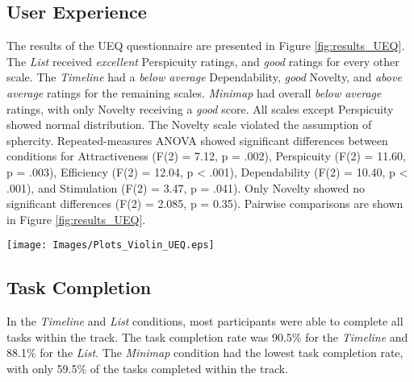 \subsection{User Experience}
The results of the UEQ questionnaire are presented in Figure \ref{fig:results_UEQ}. The \textit{List} received \textit{excellent} Perspicuity ratings, and \textit{good} ratings for every other scale. The \textit{Timeline} had a \textit{below average} Dependability, \textit{good} Novelty, and \textit{above average} ratings for the remaining scales. \textit{Minimap} had overall \textit{below average} ratings, with only Novelty receiving a \textit{good} score. All scales except Perspicuity showed normal distribution. The Novelty scale violated the assumption of sphercity. Repeated-measures ANOVA showed significant differences between conditions for Attractiveness (F(2) = 7.12, p = .002), Perspicuity (F(2) = 11.60, p = .003), Efficiency (F(2) = 12.04, p < .001), Dependability (F(2) = 10.40, p < .001), and Stimulation (F(2) = 3.47, p = .041). Only Novelty showed no significant differences (F(2) = 2.085, p = 0.35). Pairwise comparisons are shown in Figure \ref{fig:results_UEQ}.

\begin{figure*}[ht]
    \centering
    \texttt{[image: Images/Plots\_Violin\_UEQ.eps]}
    \caption{Violin plots for mean values across UEQ scales, split by condition. Scales range from -3 to +3, higher is better. Significant differences are marked with lines between plots.}
    \label{fig:results_UEQ}
\end{figure*}


\subsection{Task Completion}
In the \textit{Timeline} and \textit{List} conditions, most participants were able to complete all tasks within the track. The task completion rate was 90.5\% for the \textit{Timeline} and 88.1\% for the \textit{List}. The \textit{Minimap} condition had the lowest task completion rate, with only 59.5\% of the tasks completed within the track.


